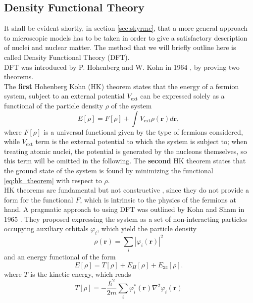\subsection{Density Functional Theory}
\label{sec:dft}
It shall be evident shortly, in section \ref{sec:skyrme}, that a more general approach to microscopic models has to be taken in order to give a satisfactory description of nuclei and nuclear matter. The method that we will briefly outline here is called Density Functional Theory (DFT).
\\DFT was introduced by P. Hohenberg and W. Kohn in 1964 \cite{HK}, by proving two theorems.
\\The \textbf{first} Hohenberg Kohn (HK) theorem states that the energy of a fermion system, subject to an external potential $V_\text{ext}$ can be expressed solely as a functional of the particle density $\rho$ of the system
\begin{equation}
    \label{eq:hk_theorem}
    E[\rho] = F[\rho] + \int V_\text{ext} \rho(\bm r) d\mathbf r,
\end{equation}
where $F[\rho]$ is a universal functional given by the type of fermions considered, while $V_\text{ext}$ term is the external potential to which the system is subject to; when treating atomic nuclei, the potential is generated by the nucleons themselves, so this term will be omitted in the following.
The \textbf{second} HK theorem states that the ground state of the system is found by minimizing the functional \eqref{eq:hk_theorem} with respect to $\rho$. 
\\HK theorems are fundamental but not constructive \cite{NDFT}, since they do not provide a form for the functional $F$, which is intrinsic to the physics of the fermions at hand.
A pragmatic approach to using DFT was outlined by Kohn and Sham in 1965 \cite{KS}. They proposed expressing the system as a set of non-interacting particles occupying auxiliary orbitals $\varphi_i$, which yield the particle density
\begin{equation}
    \rho(\bm r)=\sum_i |\varphi_i(\bm r)|^2 
\end{equation}
and an energy functional of the form
\begin{equation}
    E[\rho] = T[\rho] + E_H[\rho] + E_\text{xc}[\rho].
\end{equation}
where $T$ is the kinetic energy, which reads
\begin{equation}
    \label{eq:kin_functional}
    T[\rho] = -\frac{\hbar^2}{2m}\sum_i \varphi_i ^*(\bm r)\nabla^2 \varphi_i(\bm r)
\end{equation}
